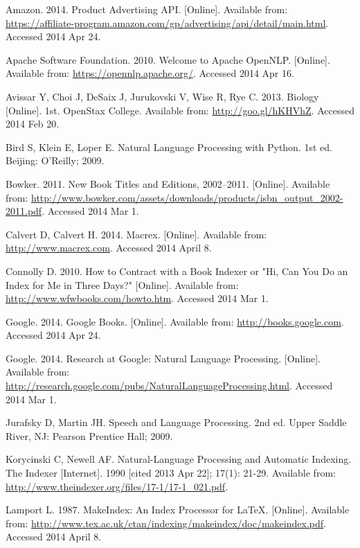 \pagebreak
\begin{thebibliography}{99}

Amazon. 2014. Product Advertising API. [Online]. Available from: \url{https://affiliate-program.amazon.com/gp/advertising/api/detail/main.html}. Accessed 2014 Apr 24.

Apache Software Foundation. 2010. Welcome to Apache OpenNLP. [Online]. Available from: \url{https://opennlp.apache.org/}. Accessed 2014 Apr 16.

Avissar Y, Choi J, DeSaix J, Jurukovski V, Wise R, Rye C. 2013. Biology [Online]. 1st. OpenStax College. Available from: \url{http://goo.gl/hKHVhZ}. Accessed 2014 Feb 20.

Bird S, Klein E, Loper E. Natural Language Processing with Python. 1st ed. Beijing: O'Reilly; 2009.

Bowker. 2011. New Book Titles and Editions, 2002--2011. [Online]. Available from: \url{http://www.bowker.com/assets/downloads/products/isbn_output_2002-2011.pdf}. Accessed 2014 Mar 1.

Calvert D, Calvert H. 2014. Macrex. [Online]. Available from: \url{http://www.macrex.com}. Accessed 2014 April 8.

Connolly D. 2010. How to Contract with a Book Indexer or "Hi, Can You Do an Index for Me in Three Days?" [Online]. Available from: \url{http://www.wfwbooks.com/howto.htm}. Accessed 2014 Mar 1.

Google. 2014. Google Books. [Online]. Available from: \url{http://books.google.com}. Accessed 2014 Apr 24.

Google. 2014. Research at Google: Natural Language Processing. [Online]. Available from: \url{http://research.google.com/pubs/NaturalLanguageProcessing.html}. Accessed 2014 Mar 1.

Jurafsky D, Martin JH. Speech and Language Processing. 2nd ed. Upper Saddle River, NJ: Pearson Prentice Hall; 2009.

Korycinski C, Newell AF. Natural-Language Processing and Automatic Indexing. The Indexer [Internet]. 1990 [cited 2013 Apr 22]; 17(1): 21-29. Available from: \url{http://www.theindexer.org/files/17-1/17-1_021.pdf}.

Lamport L. 1987. MakeIndex: An Index Processor for \LaTeX. [Online]. Available from: \url{http://www.tex.ac.uk/ctan/indexing/makeindex/doc/makeindex.pdf}. Accessed 2014 April 8.


\end{thebibliography}
